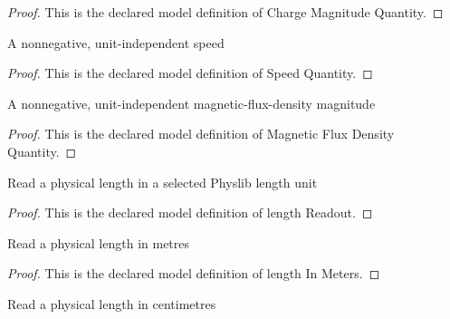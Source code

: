 \begin{proof}
  This is the declared model definition of Charge Magnitude Quantity.
\end{proof}
\begin{definition}
  \label{def:physics:phyx-mini-0957:phyxminiproblems-problemphyxmini0957-speedquantity}
  A nonnegative, unit-independent speed
\end{definition}
\begin{proof}
  This is the declared model definition of Speed Quantity.
\end{proof}
\begin{definition}
  \label{def:physics:phyx-mini-0957:phyxminiproblems-problemphyxmini0957-magneticfluxdensityquantity}
  A nonnegative, unit-independent magnetic-flux-density magnitude
\end{definition}
\begin{proof}
  This is the declared model definition of Magnetic Flux Density Quantity.
\end{proof}
\begin{definition}
  \label{def:physics:phyx-mini-0957:phyxminiproblems-problemphyxmini0957-lengthreadout}
  Read a physical length in a selected Physlib length unit
\end{definition}
\begin{proof}
  This is the declared model definition of length Readout.
\end{proof}
\begin{definition}
  \label{def:physics:phyx-mini-0957:phyxminiproblems-problemphyxmini0957-lengthinmeters}
  Read a physical length in metres
\end{definition}
\begin{proof}
  This is the declared model definition of length In Meters.
\end{proof}
\begin{definition}
  \label{def:physics:phyx-mini-0957:phyxminiproblems-problemphyxmini0957-lengthincentimeters}
  Read a physical length in centimetres
\end{definition}

